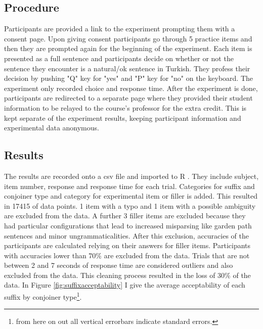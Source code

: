 \subsection{Procedure}
Participants are provided a link to the experiment prompting them with a consent page. Upon giving consent participants go through 5 practice items and then they are prompted again for the beginning of the experiment. Each item is presented as a full sentence and participants decide on whether or not the sentence they encounter is a natural/ok sentence in Turkish. They profess their decision by pushing "Q" key for "yes" and "P" key for "no" on the keyboard. The experiment only recorded choice and response time. After the experiment is done, participants are redirected to a separate page where they provided their student information to be relayed to the course's professor for the extra credit. This is kept separate of the experiment results, keeping participant information and experimental data anonymous.

\subsection{Results}

The results are recorded onto a csv file and imported to R \citep{team2013r}. They include subject, item number, response and response time for each trial. Categories for suffix and conjoiner type and category for experimental item or filler is added. This resulted in 17415 of data points. 1 item with a typo and 1 item with a possible ambiguity are excluded from the data. A further 3 filler items are excluded because they had particular configurations that lead to increased misparsing like garden path sentences and minor ungrammaticalities. After this exclusion, accuracies of the participants are calculated relying on their answers for filler items. Participants with accuracies lower than 70\% are excluded from the data. Trials that are not between 2 and 7 seconds of response time are considered outliers and also excluded from the data. This cleaning process resulted in the loss of 30\% of the data. In Figure \ref{fig:suffixacceptability} I give the average acceptability of each suffix by conjoiner type\footnote{from here on out all vertical errorbars indicate standard errors.}.

